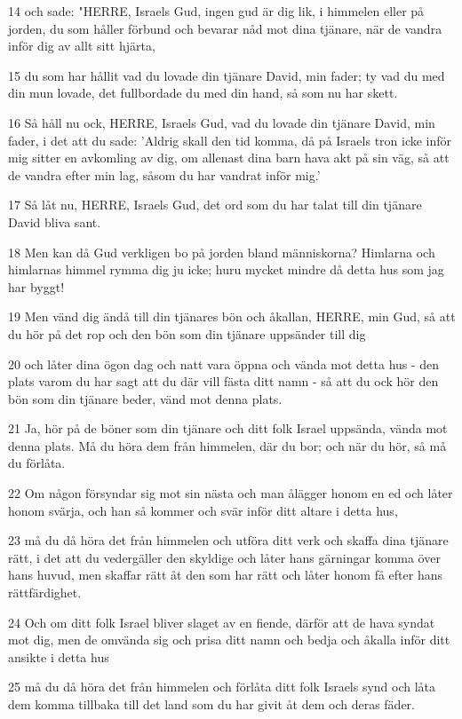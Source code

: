 \par 14 och sade: "HERRE, Israels Gud, ingen gud är dig lik, i himmelen eller på jorden, du som håller förbund och bevarar nåd mot dina tjänare, när de vandra inför dig av allt sitt hjärta,
\par 15 du som har hållit vad du lovade din tjänare David, min fader; ty vad du med din mun lovade, det fullbordade du med din hand, så som nu har skett.
\par 16 Så håll nu ock, HERRE, Israels Gud, vad du lovade din tjänare David, min fader, i det att du sade: 'Aldrig skall den tid komma, då på Israels tron icke inför mig sitter en avkomling av dig, om allenast dina barn hava akt på sin väg, så att de vandra efter min lag, såsom du har vandrat inför mig.'
\par 17 Så låt nu, HERRE, Israels Gud, det ord som du har talat till din tjänare David bliva sant.
\par 18 Men kan då Gud verkligen bo på jorden bland människorna? Himlarna och himlarnas himmel rymma dig ju icke; huru mycket mindre då detta hus som jag har byggt!
\par 19 Men vänd dig ändå till din tjänares bön och åkallan, HERRE, min Gud, så att du hör på det rop och den bön som din tjänare uppsänder till dig
\par 20 och låter dina ögon dag och natt vara öppna och vända mot detta hus - den plats varom du har sagt att du där vill fästa ditt namn - så att du ock hör den bön som din tjänare beder, vänd mot denna plats.
\par 21 Ja, hör på de böner som din tjänare och ditt folk Israel uppsända, vända mot denna plats. Må du höra dem från himmelen, där du bor; och när du hör, så må du förlåta.
\par 22 Om någon försyndar sig mot sin nästa och man ålägger honom en ed och låter honom svärja, och han så kommer och svär inför ditt altare i detta hus,
\par 23 må du då höra det från himmelen och utföra ditt verk och skaffa dina tjänare rätt, i det att du vedergäller den skyldige och låter hans gärningar komma över hans huvud, men skaffar rätt åt den som har rätt och låter honom få efter hans rättfärdighet.
\par 24 Och om ditt folk Israel bliver slaget av en fiende, därför att de hava syndat mot dig, men de omvända sig och prisa ditt namn och bedja och åkalla inför ditt ansikte i detta hus
\par 25 må du då höra det från himmelen och förlåta ditt folk Israels synd och låta dem komma tillbaka till det land som du har givit åt dem och deras fäder.
